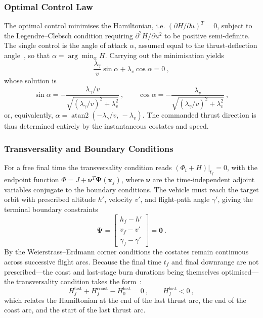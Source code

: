 \subsubsection{Optimal Control Law}

The optimal control minimises the Hamiltonian, i.e. $(\partial H/\partial u)^{T}=0$, subject to the Legendre--Clebsch condition requiring $\partial^{2}H/\partial u^{2}$ to be positive semi-definite. The single control is the angle of attack $\alpha$, assumed equal to the thrust-deflection angle~\cite{pallone2016}, so that $\alpha = \arg\min_\alpha H$. Carrying out the minimisation yields
\begin{equation}
\frac{\lambda_\gamma}{v}\sin\alpha + \lambda_v\cos\alpha = 0 \ ,
\label{eq:indirect_control_implicit}
\end{equation}
whose solution is
\begin{equation}
\sin\alpha = -\frac{\lambda_\gamma/v}{\sqrt{\left(\lambda_\gamma/v\right)^{2} + \lambda_v^{2}}} \ ,
\qquad
\cos\alpha = -\frac{\lambda_v}{\sqrt{\left(\lambda_\gamma/v\right)^{2} + \lambda_v^{2}}} \ ,
\label{eq:indirect_control}
\end{equation}
or, equivalently, $\alpha = \operatorname{atan2}\!\left(-\lambda_\gamma/v,\,-\lambda_v\right)$. The commanded thrust direction is thus determined entirely by the instantaneous costates and speed.

\subsubsection{Transversality and Boundary Conditions}

For a free final time the transversality condition reads $(\Phi_t + H)|_{t_f}=0$, with the endpoint function $\Phi = J + \boldsymbol{\nu}^{T}\boldsymbol{\Psi}(\mathbf{x}_f)$, where $\boldsymbol{\nu}$ are the time-independent adjoint variables conjugate to the boundary conditions. The vehicle must reach the target orbit with prescribed altitude $h'$, velocity $v'$, and flight-path angle $\gamma'$, giving the terminal boundary constraints
\begin{equation}
\boldsymbol{\Psi} =
\begin{bmatrix} h_f - h' \\ v_f - v' \\ \gamma_f - \gamma' \end{bmatrix} = \mathbf{0} \ .
\label{eq:indirect_terminal}
\end{equation}
By the Weierstrass--Erdmann corner conditions the costates remain continuous across successive flight arcs. Because the final time $t_f$ and final downrange are not prescribed---the coast and last-stage burn durations being themselves optimised---the transversality condition takes the form~\cite{pontani2014particle}:
\begin{equation}
H_f^{\text{last}} + H_f^{\text{coast}} - H_0^{\text{last}} = 0 \ ,
\qquad H_f^{\text{last}} < 0 \ ,
\label{eq:indirect_transversality}
\end{equation}
which relates the Hamiltonian at the end of the last thrust arc, the end of the coast arc, and the start of the last thrust arc.

